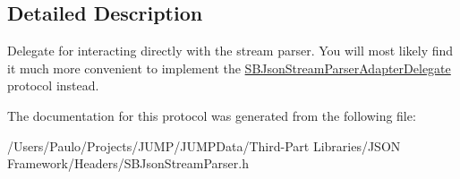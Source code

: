 \subsection{Detailed Description}
Delegate for interacting directly with the stream parser. You will most likely find it much more convenient to implement the \hyperlink{protocol_s_b_json_stream_parser_adapter_delegate-p}{SBJsonStreamParserAdapterDelegate} protocol instead. 

The documentation for this protocol was generated from the following file:\begin{DoxyCompactItemize}
\item 
/Users/Paulo/Projects/JUMP/JUMPData/Third-\/Part Libraries/JSON Framework/Headers/SBJsonStreamParser.h\end{DoxyCompactItemize}
